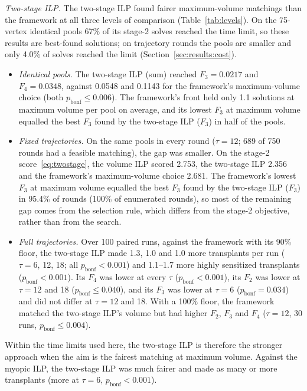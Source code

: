 \documentclass[journal]{IEEEtran}
\begin{document}
\emph{Two-stage ILP.} The two-stage ILP found fairer maximum-volume
matchings than the framework at all three levels of comparison
(Table~\ref{tab:levels}). On the 75-vertex identical pools 67\% of its
stage-2 solves reached the time limit, so these results are best-found
solutions; on trajectory rounds the pools are smaller and only 4.0\% of
solves reached the limit (Section~\ref{sec:results:cost}).
\begin{itemize}
  \item \emph{Identical pools.} The two-stage ILP (sum) reached
    $F_3 = 0.0217$ and $F_4 = 0.0348$, against 0.0548 and 0.1143 for
    the framework's maximum-volume choice (both
    $p_{\mathrm{bonf}} \leq 0.006$). The framework's front held only
    1.1 solutions at maximum volume per pool on average, and its
    lowest $F_3$ at maximum volume equalled the best $F_3$ found by the
    two-stage ILP ($F_3$) in half of the pools.
  \item \emph{Fixed trajectories.} On the same pools in every round
    ($\tau = 12$; 689 of 750 rounds had a feasible matching), the gap was smaller. On the stage-2
    score~\eqref{eq:twostage}, the volume ILP scored 2.753, the
    two-stage ILP 2.356 and the framework's maximum-volume choice
    2.681. The framework's lowest $F_3$ at maximum volume equalled the
    best $F_3$ found by the two-stage ILP ($F_3$) in 95.4\% of rounds
    (100\% of enumerated rounds), so most of the remaining gap comes from
    the selection rule, which differs from the stage-2 objective, rather
    than from the search.
  \item \emph{Full trajectories.} Over 100 paired runs, against the
    framework with its 90\% floor, the two-stage ILP made 1.3, 1.0 and
    1.0 more transplants per run ($\tau = 6$, 12, 18; all
    $p_{\mathrm{bonf}} < 0.001$) and 1.1--1.7 more highly sensitized
    transplants ($p_{\mathrm{bonf}} < 0.001$). Its $F_4$ was lower at
    every $\tau$ ($p_{\mathrm{bonf}} < 0.001$), its $F_2$ was lower at
    $\tau = 12$ and 18 ($p_{\mathrm{bonf}} \leq 0.040$), and its $F_3$ was
    lower at $\tau = 6$ ($p_{\mathrm{bonf}} = 0.034$) and did not differ
    at $\tau = 12$ and 18. With a 100\% floor, the framework matched the
    two-stage ILP's volume but had higher $F_2$, $F_3$ and $F_4$
    ($\tau = 12$, 30 runs, $p_{\mathrm{bonf}} \leq 0.004$).
\end{itemize}
Within the time limits used here, the two-stage ILP is therefore the
stronger approach when the aim is the fairest matching at maximum volume. Against the myopic ILP, the two-stage ILP was much fairer
and made as many or more transplants (more at $\tau = 6$,
$p_{\mathrm{bonf}} < 0.001$).
\end{document}
